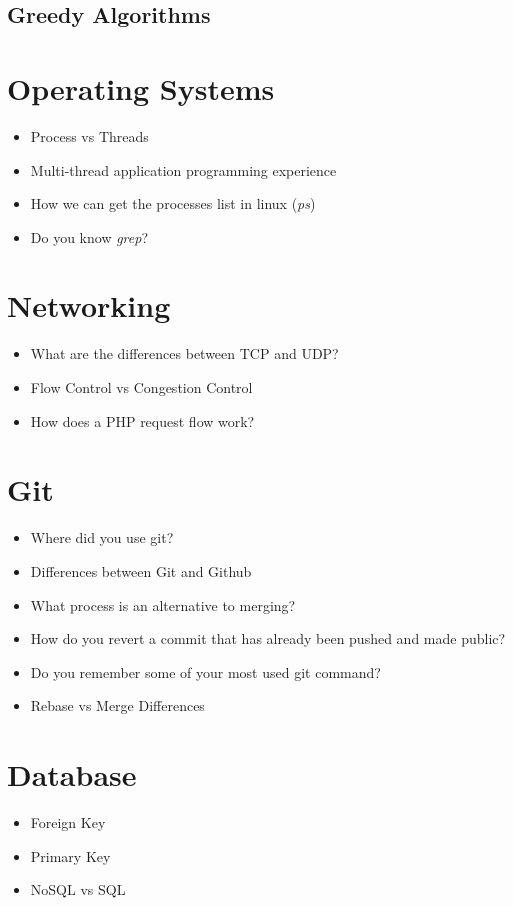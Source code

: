 \documentclass[]{article}
\begin{document}
\begin{multicols}{2}
\subsection{Greedy Algorithms}

\section{Operating Systems}
\begin{itemize}
  \item Process vs Threads
  \item Multi-thread application programming experience
  \item How we can get the processes list in linux (\textit{ps})
  \item Do you know \textit{grep}?
\end{itemize}

\section{Networking}
\begin{itemize}
  \item What are the differences between TCP and UDP\@?
  \item Flow Control vs Congestion Control
  \item How does a PHP request flow work?
\end{itemize}

\section{Git}
\begin{itemize}
  \item Where did you use git?
  \item Differences between Git and Github
  \item What process is an alternative to merging?
  \item How do you revert a commit that has already been pushed and made public?
  \item Do you remember some of your most used git command?
  \item Rebase vs Merge Differences
\end{itemize}

\section{Database}

\begin{itemize}
  \item Foreign Key
  \item Primary Key
  \item NoSQL vs SQL
\end{itemize}


\end{multicols}
\end{document}
